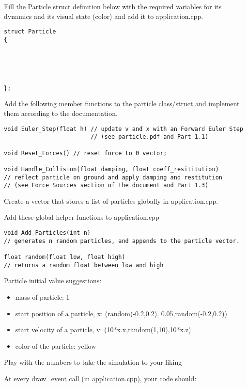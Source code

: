\documentclass[12pt]{article}
\newcounter{problem}
\newcounter{problempart}[problem]
\newcounter{solutionpart}[problem]
\newenvironment{problem}{\stepcounter{problem}\noindent{\bf\arabic{problem}.}}{\setcounter{problempart}{0}\setcounter{solutionpart}{0}}
\begin{document}
\begin{problem}
Fill the Particle struct definition below with the required
variables for its dynamics and its visual state (color) and add it to application.cpp.
\end{problem}
\begin{lstlisting}
struct Particle
{





};
\end{lstlisting}

Add the following member functions to the particle class/struct and
implement them according to the documentation.
\begin{lstlisting}
void Euler_Step(float h) // update v and x with an Forward Euler Step 
                         // (see particle.pdf and Part 1.1)

void Reset_Forces() // reset force to 0 vector;

void Handle_Collision(float damping, float coeff_resititution) 
// reflect particle on ground and apply damping and restitution
// (see Force Sources section of the document and Part 1.3)
\end{lstlisting}

Create a vector that stores a list of particles globally in application.cpp.

Add these global helper functions to application.cpp

\begin{lstlisting}
void Add_Particles(int n) 
// generates n random particles, and appends to the particle vector.

float random(float low, float high)
// returns a random float between low and high
\end{lstlisting}


Particle initial value suggestions:
\begin{itemize}
\item mass of particle: 1
\item start position of a particle, x: (random(-0.2,0.2), 0.05,random(-0.2,0.2))
\item start velocity of a particle, v: (10*x.x,random(1,10),10*x.z)
\item color of the particle: yellow
\end{itemize}

Play with the numbers to take the simulation to your liking

At every draw\_event call (in application.cpp), your code should:
\end{document}
